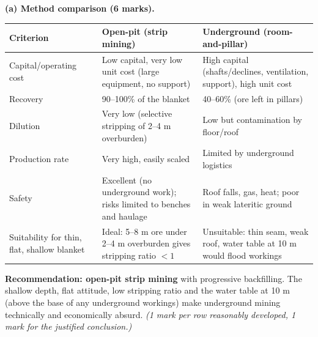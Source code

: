 \documentclass[11pt]{article}
\begin{document}
\begin{corrige}
\textbf{(a) Method comparison (6 marks).}
\begin{center}
\begin{tabularx}{\linewidth}{|l|X|X|}\hline
\rowcolor{popblueL} Criterion & Open-pit (strip mining) & Underground (room-and-pillar) \\ \hline
Capital/operating cost & Low capital, very low unit cost (large equipment, no support) & High capital (shafts/declines, ventilation, support), high unit cost \\
Recovery & 90--100\% of the blanket & 40--60\% (ore left in pillars) \\
Dilution & Very low (selective stripping of 2--4 m overburden) & Low but contamination by floor/roof \\
Production rate & Very high, easily scaled & Limited by underground logistics \\
Safety & Excellent (no underground work); risks limited to benches and haulage & Roof falls, gas, heat; poor in weak lateritic ground \\
Suitability for thin, flat, shallow blanket & Ideal: 5--8 m ore under 2--4 m overburden gives stripping ratio $<1$ & Unsuitable: thin seam, weak roof, water table at 10 m would flood workings \\ \hline
\end{tabularx}
\end{center}
\textbf{Recommendation: open-pit strip mining} with progressive backfilling. The shallow depth, flat attitude, low stripping ratio and the water table at 10 m (above the base of any underground workings) make underground mining technically and economically absurd. \emph{(1 mark per row reasonably developed, 1 mark for the justified conclusion.)}


\end{corrige}
\end{document}

